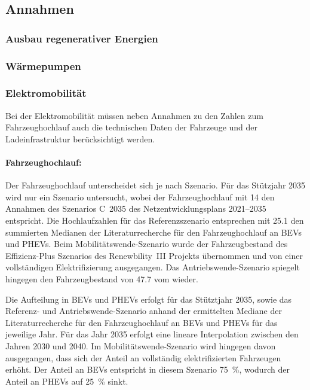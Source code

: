 \subsection{Annahmen}

\subsubsection{Ausbau regenerativer Energien}

\subsubsection{Wärmepumpen}

\subsubsection{Elektromobilität}

Bei der Elektromobilität müssen neben Annahmen zu den Zahlen zum Fahrzeughochlauf auch die technischen Daten der Fahrzeuge und der Ladeinfrastruktur berücksichtigt werden.

\paragraph{Fahrzeughochlauf:}
Der Fahrzeughochlauf unterscheidet sich je nach Szenario.
Für das Stützjahr \num{2035} wird nur ein Szenario untersucht, wobei der Fahrzeughochlauf mit \SI{14}{\MioStk} den Annahmen des Szenarios C~\num{2035} des Netzentwicklungsplans \numrange[range-phrase=~{--}~]{2021}{2035} \cite{BNetzA2020} entspricht.
Die Hochlaufzahlen für das Referenzszenario entsprechen mit \SI{25.1}{\MioStk} den summierten Medianen der Literaturrecherche für den Fahrzeughochlauf an \glspl{BEV} und \glspl{PHEV}.
Beim Mobilitätswende-Szenario wurde der Fahrzeugbestand des Effizienz-Plus Szenarios des Renewbility~III Projekts \cite{Institut2016} übernommen und von einer vollständigen Elektrifizierung ausgegangen.
Das Antriebswende-Szenario spiegelt hingegen den Fahrzeugbestand von \SI{47.7}{\MioStk} vom  \cite{KBA2020} wieder.



Die Aufteilung in \glspl{BEV} und \glspl{PHEV} erfolgt für das Stütztjahr \num{2035}, sowie das Referenz- und Antriebswende-Szenario anhand der ermittelten Mediane der Literaturrecherche für den Fahrzeughochlauf an \glspl{BEV} und \glspl{PHEV} für das jeweilige Jahr.
Für das Jahr \num{2035} erfolgt eine lineare Interpolation zwischen den Jahren \num{2030} und \num{2040}.
Im Mobilitätswende-Szenario wird hingegen davon ausgegangen, dass sich der Anteil an vollständig elektrifizierten Fahrzeugen erhöht.
Der Anteil an \glspl{BEV} entspricht in diesem Szenario \SI{75}{\percent}, wodurch der Anteil an \glspl{PHEV} auf \SI{25}{\percent} sinkt.\medskip


